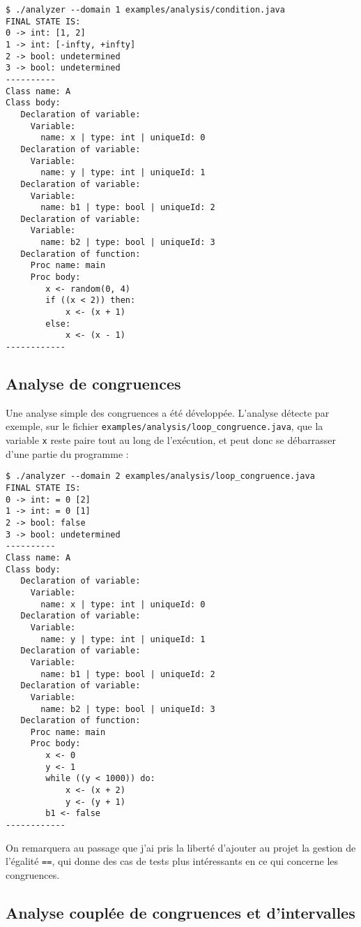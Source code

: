 \documentclass[paper=a4, fontsize=11pt]{scrartcl}
\numberwithin{figure}{section}			%
\numberwithin{table}{section}				%
\begin{document}
\begin{verbatim}
$ ./analyzer --domain 1 examples/analysis/condition.java
FINAL STATE IS:
0 -> int: [1, 2]
1 -> int: [-infty, +infty]
2 -> bool: undetermined
3 -> bool: undetermined
----------
Class name: A
Class body:
   Declaration of variable:
     Variable:
       name: x | type: int | uniqueId: 0
   Declaration of variable:
     Variable:
       name: y | type: int | uniqueId: 1
   Declaration of variable:
     Variable:
       name: b1 | type: bool | uniqueId: 2
   Declaration of variable:
     Variable:
       name: b2 | type: bool | uniqueId: 3
   Declaration of function:
     Proc name: main
     Proc body:
        x <- random(0, 4)
        if ((x < 2)) then:
            x <- (x + 1)
        else:
            x <- (x - 1)
------------
\end{verbatim}

\subsection{Analyse de congruences}

Une analyse simple des congruences a été développée. L'analyse détecte par exemple, sur le fichier \texttt{examples/analysis/loop\_congruence.java}, que la variable \texttt{x} reste paire tout au long de l'exécution, et peut donc se débarrasser d'une partie du programme :

\begin{verbatim}
$ ./analyzer --domain 2 examples/analysis/loop_congruence.java
FINAL STATE IS:
0 -> int: = 0 [2]
1 -> int: = 0 [1]
2 -> bool: false
3 -> bool: undetermined
----------
Class name: A
Class body:
   Declaration of variable:
     Variable:
       name: x | type: int | uniqueId: 0
   Declaration of variable:
     Variable:
       name: y | type: int | uniqueId: 1
   Declaration of variable:
     Variable:
       name: b1 | type: bool | uniqueId: 2
   Declaration of variable:
     Variable:
       name: b2 | type: bool | uniqueId: 3
   Declaration of function:
     Proc name: main
     Proc body:
        x <- 0
        y <- 1
        while ((y < 1000)) do:
            x <- (x + 2)
            y <- (y + 1)
        b1 <- false
------------
\end{verbatim}

On remarquera au passage que j'ai pris la liberté d'ajouter au projet la gestion de l'égalité \texttt{==}, qui donne des cas de tests plus intéressants en ce qui concerne les congruences.

\subsection{Analyse couplée de congruences et d'intervalles}
\end{document}
